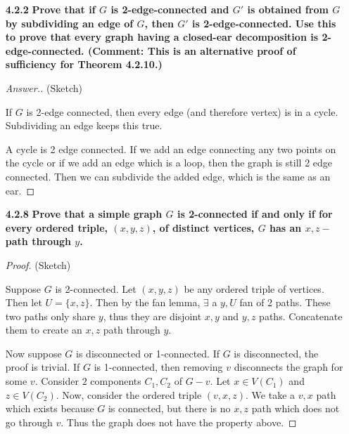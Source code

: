 \documentclass[11pt]{amsart}
\theoremstyle{plain}
\theoremstyle{definition}
\theoremstyle{example}
\begin{document}
\begin{enumerate}[\qquad]
\begin{enumerate}[\bf (a)]
\begin{proof}
\end{proof}
\end{enumerate}
\bigskip




\item[\bf 4.2.2] {\bf Prove that if $G$ is 2-edge-connected and $G'$ is obtained from $G$ by subdividing an edge of $G$, then $G'$ is 2-edge-connected. Use this to prove that every graph having a closed-ear decomposition is 2-edge-connected. (Comment: This is an alternative proof of sufficiency for Theorem 4.2.10.)}\\

\begin{proof}[Answer.] (Sketch)

If $G$ is 2-edge connected, then every edge (and therefore vertex) is in a cycle. Subdividing an edge keeps this true.

A cycle is 2 edge connected. If we add an edge connecting any two points on the cycle or if we add an edge which is a loop, then the graph is still 2 edge connected. Then we can subdivide the added edge, which is the same as an ear. 




\end{proof}

\bigskip




\item[\bf 4.2.8] {\bf Prove that a simple graph $G$ is 2-connected if and only if for every ordered triple, $(x,y,z)$, of distinct vertices, $G$ has an $x,z-$path through $y$.
}

\begin{proof} (Sketch)

Suppose $G$ is 2-connected. Let $(x,y,z)$ be any ordered triple of vertices. Then let $U = \{x,z\}$. Then by the fan lemma, $\exists$ a $y, U$ fan of 2 paths. These two paths only share $y$, thus they are disjoint $x,y$ and $y,z$ paths. Concatenate them to create an $x,z$ path through $y$.

Now suppose $G$ is disconnected or 1-connected. If $G$ is disconnected, the proof is trivial. If $G$ is 1-connected, then removing $v$ disconnects the graph for some $v$. Consider $2$ components $C_1, C_2$ of $G-v$. Let $x \in V(C_1)$ and $z \in V(C_2)$. Now, consider the ordered triple $(v,x,z)$. We take a $v,x$ path which exists because $G$ is connected, but there is no $x,z$ path which does not go through $v$. Thus the graph does not have the property above.



\end{proof}
\end{enumerate}
\end{document}
